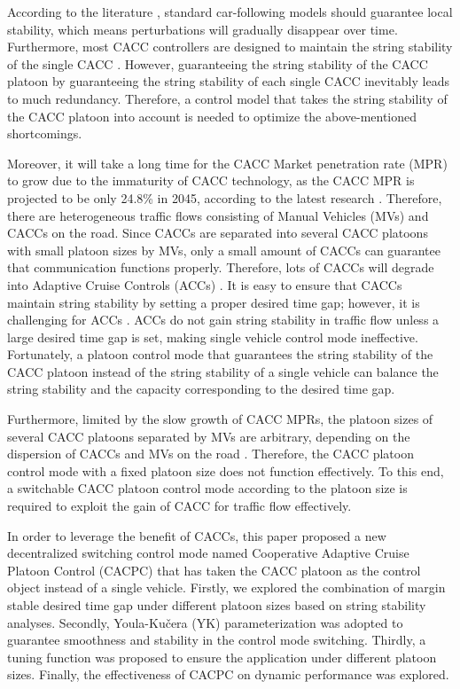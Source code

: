 \documentclass[journal]{IEEEtran}
\begin{document}
According to the literature \citep{qin2018stability,ruan2021stability}, standard car-following models should guarantee local stability, which means perturbations will gradually disappear over time. Furthermore, most CACC controllers are designed to maintain the string stability of the single CACC \citep{wang2018infrastructure,sun2018stability,ploeg2013lp}. However, guaranteeing the string stability of the CACC platoon by guaranteeing the string stability of each single CACC inevitably leads to much redundancy. Therefore, a control model that takes the string stability of the CACC platoon into account is needed to optimize the above-mentioned shortcomings.

Moreover, it will take a long time for the CACC Market penetration rate (MPR) to grow due to the immaturity of CACC technology, as the CACC MPR is projected to be only 24.8\% in 2045, according to the latest research \citep{Bansal2017}. Therefore, there are heterogeneous traffic flows consisting of Manual Vehicles (MVs) and CACCs on the road. Since CACCs are separated into several CACC platoons with small platoon sizes by MVs, only a small amount of CACCs can guarantee that communication functions properly. Therefore, lots of CACCs will degrade into Adaptive Cruise Controls (ACCs) \citep{ruanImpactsInformationFlow2022,Yao2021}. It is easy to ensure that CACCs maintain string stability by setting a proper desired time gap; however, it is challenging for ACCs \citep{Montanino2021a,Shang2021}. ACCs do not gain string stability in traffic flow unless a large desired time gap is set, making single vehicle control mode ineffective. Fortunately, a platoon control mode that guarantees the string stability of the CACC platoon instead of the string stability of a single vehicle can balance the string stability and the capacity corresponding to the desired time gap.

Furthermore, limited by the slow growth of CACC MPRs, the platoon sizes of several CACC platoons separated by MVs are arbitrary, depending on the dispersion of CACCs and MVs on the road \citep{zhou2020stabilizing}. Therefore, the CACC platoon control mode with a fixed platoon size does not function effectively. To this end, a switchable CACC platoon control mode according to the platoon size is required to exploit the gain of CACC for traffic flow effectively.

In order to leverage the benefit of CACCs, this paper proposed a new decentralized switching control mode named Cooperative Adaptive Cruise Platoon Control (CACPC) that has taken the CACC platoon as the control object instead of a single vehicle. Firstly, we explored the combination of margin stable desired time gap under different platoon sizes based on string stability analyses. Secondly, Youla-Kučera (YK) parameterization was adopted to guarantee smoothness and stability in the control mode switching. Thirdly, a tuning function was proposed to ensure the application under different platoon sizes. Finally, the effectiveness of CACPC on dynamic performance was explored.
\end{document}

